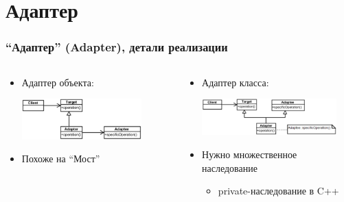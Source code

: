 \documentclass[xetex,mathserif,serif]{beamer}
\begin{document}
    \section{Адаптер}

    \begin{frame}
        \frametitle{``Адаптер'' (Adapter), детали реализации}
        \begin{columns}
            \begin{column}{0.5\textwidth}
                \begin{itemize}
                    \item Адаптер объекта:
                        \vspace{0.3cm}
                        
                        \includegraphics[width=0.8\textwidth]{objectAdapter.png}
                        \vspace{0.3cm}
                    \item Похоже на ``Мост''
                \end{itemize}
            \end{column}
            \begin{column}{0.5\textwidth}
                \begin{itemize}
                    \item Адаптер класса:
                        \vspace{0.3cm}
                        
                        \includegraphics[width=0.9\textwidth]{classAdapter.png}
                        \vspace{0.3cm}
                    \item Нужно множественное наследование
                    \begin{itemize}
                        \item private-наследование в C++
                    \end{itemize}
                \end{itemize}
            \end{column}
        \end{columns}
    \end{frame}
\end{document}
